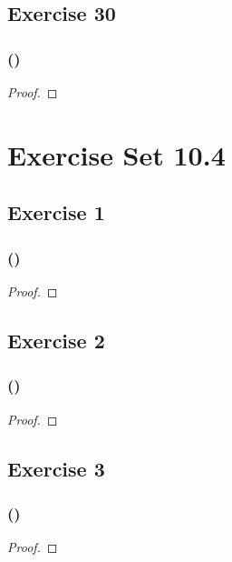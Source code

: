 \documentclass[14pt]{extarticle}
\begin{document}
\subsection{Exercise 30}

\subsubsection{()}

\begin{proof}

\end{proof}

\section{Exercise Set 10.4}
\subsection{Exercise 1}

\subsubsection{()}

\begin{proof}

\end{proof}

\subsection{Exercise 2}

\subsubsection{()}

\begin{proof}

\end{proof}

\subsection{Exercise 3}

\subsubsection{()}

\begin{proof}

\end{proof}
\end{document}
